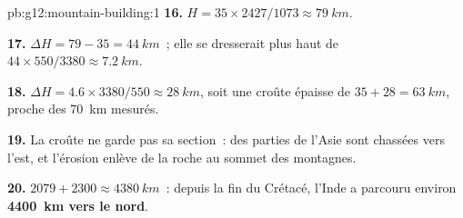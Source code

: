 \begin{solution}{pb:g12:mountain-building:1}
\textbf{16.} $H = 35 \times 2427/1073 \approx \qty{79}{km}$.

\textbf{17.} $\Delta H = 79 - 35 = \qty{44}{km}$~; elle se dresserait plus
haut de $44 \times 550/3380 \approx \qty{7.2}{km}$.

\textbf{18.} $\Delta H = 4.6 \times 3380/550 \approx \qty{28}{km}$, soit une
croûte épaisse de $35 + 28 = \qty{63}{km}$, proche des \qty{70}{km}
mesurés.

\textbf{19.} La croûte ne garde pas sa section~: des parties de l'Asie sont
chassées vers l'est, et l'érosion enlève de la roche au sommet des
montagnes.

\textbf{20.} $2079 + 2300 \approx \qty{4380}{km}$~: depuis la fin du
Crétacé, l'Inde a parcouru environ \textbf{\qty{4400}{km} vers le nord}.
\end{solution}

